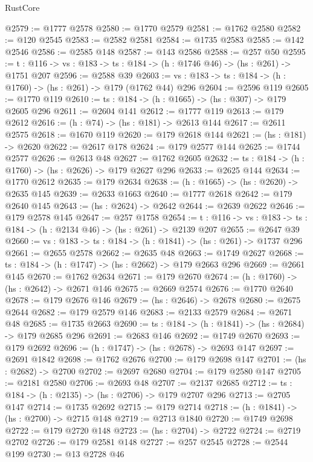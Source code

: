 \begin{lexlean}{RustCore}
\begin{coremodule}
@2579 := @1777 @2578
@2580 := @1770 @2579
@2581 := @1762 @2580
@2582 := @120 @2545
@2583 := @2582 @2581
@2584 := @1735 @2583
@2585 := @142 @2546
@2586 := @2585 @148
@2587 := @143 @2586
@2588 := @257 @50
@2595 := {t : @116} -> {vs : @183} -> {ts : @184} -> (h : @1746 @46) -> (hs : @261) -> @1751 @207
@2596 := @2588 @39
@2603 := {vs : @183} -> {ts : @184} -> (h : @1760) -> (hs : @261) -> @179 (@1762 @44) @296
@2604 := @2596 @119
@2605 := @1770 @119
@2610 := {ts : @184} -> (h : @1665) -> (hs : @307) -> @179 @2605 @296
@2611 := @2604 @141
@2612 := @1777 @119
@2613 := @179 @2612
@2616 := (h : @74) -> (hs : @181) -> @2613 @144
@2617 := @2611 @2575
@2618 := @1670 @119
@2620 := @179 @2618 @144
@2621 := (hs : @181) -> @2620
@2622 := @2617 @178
@2624 := @179 @2577 @144
@2625 := @1744 @2577
@2626 := @2613 @48
@2627 := @1762 @2605
@2632 := {ts : @184} -> (h : @1760) -> (hs : @2626) -> @179 @2627 @296
@2633 := @2625 @144
@2634 := @1770 @2612
@2635 := @179 @2634
@2638 := (h : @1665) -> (hs : @2620) -> @2635 @145
@2639 := @2633 @1663
@2640 := @1777 @2618
@2642 := @179 @2640 @145
@2643 := (hs : @2624) -> @2642
@2644 := @2639 @2622
@2646 := @179 @2578 @145
@2647 := @257 @1758
@2654 := {t : @116} -> {vs : @183} -> {ts : @184} -> (h : @2134 @46) -> (hs : @261) -> @2139 @207
@2655 := @2647 @39
@2660 := {vs : @183} -> {ts : @184} -> (h : @1841) -> (hs : @261) -> @1737 @296
@2661 := @2655 @2578
@2662 := @2635 @48
@2663 := @1749 @2627
@2668 := {ts : @184} -> (h : @1747) -> (hs : @2662) -> @179 @2663 @296
@2669 := @2661 @145
@2670 := @1762 @2634
@2671 := @179 @2670
@2674 := (h : @1760) -> (hs : @2642) -> @2671 @146
@2675 := @2669 @2574
@2676 := @1770 @2640
@2678 := @179 @2676 @146
@2679 := (hs : @2646) -> @2678
@2680 := @2675 @2644
@2682 := @179 @2579 @146
@2683 := @2133 @2579
@2684 := @2671 @48
@2685 := @1735 @2663
@2690 := {ts : @184} -> (h : @1841) -> (hs : @2684) -> @179 @2685 @296
@2691 := @2683 @146
@2692 := @1749 @2670
@2693 := @179 @2692
@2696 := (h : @1747) -> (hs : @2678) -> @2693 @147
@2697 := @2691 @1842
@2698 := @1762 @2676
@2700 := @179 @2698 @147
@2701 := (hs : @2682) -> @2700
@2702 := @2697 @2680
@2704 := @179 @2580 @147
@2705 := @2181 @2580
@2706 := @2693 @48
@2707 := @2137 @2685
@2712 := {ts : @184} -> (h : @2135) -> (hs : @2706) -> @179 @2707 @296
@2713 := @2705 @147
@2714 := @1735 @2692
@2715 := @179 @2714
@2718 := (h : @1841) -> (hs : @2700) -> @2715 @148
@2719 := @2713 @1840
@2720 := @1749 @2698
@2722 := @179 @2720 @148
@2723 := (hs : @2704) -> @2722
@2724 := @2719 @2702
@2726 := @179 @2581 @148
@2727 := @257 @2545
@2728 := @2544 @199
@2730 := @13 @2728 @46

\end{coremodule}
\end{lexlean}
